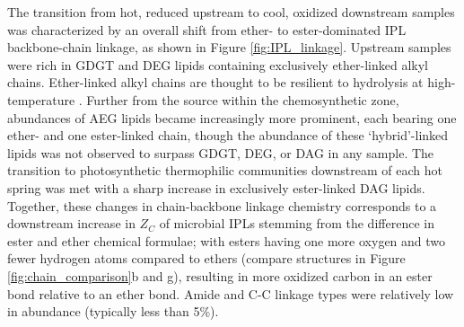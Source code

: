 The transition from hot, reduced upstream to cool, oxidized downstream samples was characterized by an overall shift from ether- to ester-dominated IPL backbone-chain linkage, as shown in Figure \ref{fig:IPL_linkage}. Upstream samples were rich in GDGT and DEG lipids containing exclusively ether-linked alkyl chains. Ether-linked alkyl chains are thought to be resilient to hydrolysis at high-temperature \citep{daniel2000biomolecular}. Further from the source within the chemosynthetic zone, abundances of AEG lipids became increasingly more prominent, each bearing one ether- and one ester-linked chain, though the abundance of these `hybrid'-linked lipids was not observed to surpass GDGT, DEG, or DAG in any sample. The transition to photosynthetic thermophilic communities downstream of each hot spring was met with a sharp increase in exclusively ester-linked DAG lipids. Together, these changes in chain-backbone linkage chemistry corresponds to a downstream increase in $Z_{C}$ of microbial IPLs stemming from the difference in ester and ether chemical formulae; with esters having one more oxygen and two fewer hydrogen atoms compared to ethers (compare structures in Figure \ref{fig:chain_comparison}b and g), resulting in more oxidized carbon in an ester bond relative to an ether bond. Amide and C-C linkage types were relatively low in abundance (typically less than 5\%).





